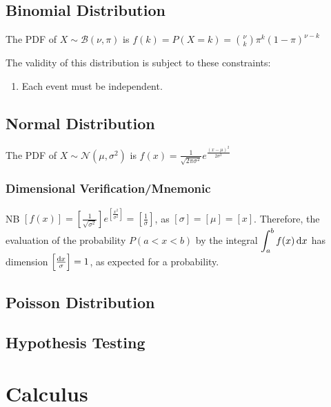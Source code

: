 \documentclass[a4paper,11pt]{article}
\begin{document}
    \subsection{Binomial Distribution}


    The PDF of $X \sim \mathcal B(\nu, \pi)$ is
    $\displaystyle f(k) = P(X = k) = {\nu \choose k} \pi^k (1 - \pi)^{\nu - k}$

    The validity of this distribution is subject to these constraints:
    \begin{enumerate}
    \item Each event must be independent.
    \end{enumerate}

    \subsection{Normal Distribution}


    The PDF of $X \sim \mathcal N(\mu, \sigma^2)$ is
    $\displaystyle f(x) = \frac{1}{\sqrt{2\pi\sigma^2}}
                            e^{\frac{(x - \mu)^2}{2\sigma^2}}$

    \subsubsection{Dimensional Verification/Mnemonic}

    NB $\displaystyle\left[f(x)\right] =
        \left[\frac 1{\sqrt{\sigma^2}}\right]
        e^{\left[\frac{x^2}{\sigma^2}\right]}
      = \left[\frac 1\sigma\right]$, as
    $\left[\sigma\right] = \left[\mu\right] = \left[x\right]$. Therefore, the
    evaluation of the probability $P(a < x < b)$ by the integral
    $\displaystyle\int_a^bf(x)\dif x$ has dimension
    $\left[\frac{\dif x}{\sigma}\right] = 1$, as expected for a probability.

    \subsection{Poisson Distribution}

    \subsection{Hypothesis Testing}


    \section{Calculus}
\end{document}
